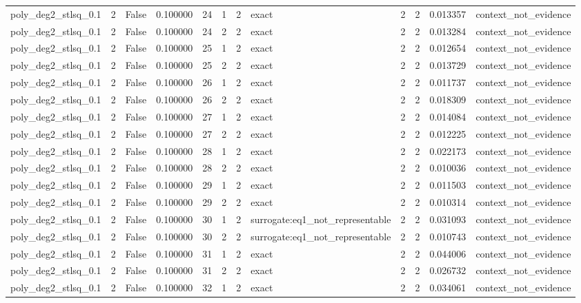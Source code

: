\begin{tabular}{lrrrrrrlrrrl}
poly\_deg2\_stlsq\_0.1 & 2 & False & 0.100000 & 24 & 1 & 2 & exact & 2 & 2 & 0.013357 & context\_not\_evidence \\
poly\_deg2\_stlsq\_0.1 & 2 & False & 0.100000 & 24 & 2 & 2 & exact & 2 & 2 & 0.013284 & context\_not\_evidence \\
poly\_deg2\_stlsq\_0.1 & 2 & False & 0.100000 & 25 & 1 & 2 & exact & 2 & 2 & 0.012654 & context\_not\_evidence \\
poly\_deg2\_stlsq\_0.1 & 2 & False & 0.100000 & 25 & 2 & 2 & exact & 2 & 2 & 0.013729 & context\_not\_evidence \\
poly\_deg2\_stlsq\_0.1 & 2 & False & 0.100000 & 26 & 1 & 2 & exact & 2 & 2 & 0.011737 & context\_not\_evidence \\
poly\_deg2\_stlsq\_0.1 & 2 & False & 0.100000 & 26 & 2 & 2 & exact & 2 & 2 & 0.018309 & context\_not\_evidence \\
poly\_deg2\_stlsq\_0.1 & 2 & False & 0.100000 & 27 & 1 & 2 & exact & 2 & 2 & 0.014084 & context\_not\_evidence \\
poly\_deg2\_stlsq\_0.1 & 2 & False & 0.100000 & 27 & 2 & 2 & exact & 2 & 2 & 0.012225 & context\_not\_evidence \\
poly\_deg2\_stlsq\_0.1 & 2 & False & 0.100000 & 28 & 1 & 2 & exact & 2 & 2 & 0.022173 & context\_not\_evidence \\
poly\_deg2\_stlsq\_0.1 & 2 & False & 0.100000 & 28 & 2 & 2 & exact & 2 & 2 & 0.010036 & context\_not\_evidence \\
poly\_deg2\_stlsq\_0.1 & 2 & False & 0.100000 & 29 & 1 & 2 & exact & 2 & 2 & 0.011503 & context\_not\_evidence \\
poly\_deg2\_stlsq\_0.1 & 2 & False & 0.100000 & 29 & 2 & 2 & exact & 2 & 2 & 0.010314 & context\_not\_evidence \\
poly\_deg2\_stlsq\_0.1 & 2 & False & 0.100000 & 30 & 1 & 2 & surrogate:eq1\_not\_representable & 2 & 2 & 0.031093 & context\_not\_evidence \\
poly\_deg2\_stlsq\_0.1 & 2 & False & 0.100000 & 30 & 2 & 2 & surrogate:eq1\_not\_representable & 2 & 2 & 0.010743 & context\_not\_evidence \\
poly\_deg2\_stlsq\_0.1 & 2 & False & 0.100000 & 31 & 1 & 2 & exact & 2 & 2 & 0.044006 & context\_not\_evidence \\
poly\_deg2\_stlsq\_0.1 & 2 & False & 0.100000 & 31 & 2 & 2 & exact & 2 & 2 & 0.026732 & context\_not\_evidence \\
poly\_deg2\_stlsq\_0.1 & 2 & False & 0.100000 & 32 & 1 & 2 & exact & 2 & 2 & 0.034061 & context\_not\_evidence \\

\end{tabular}
